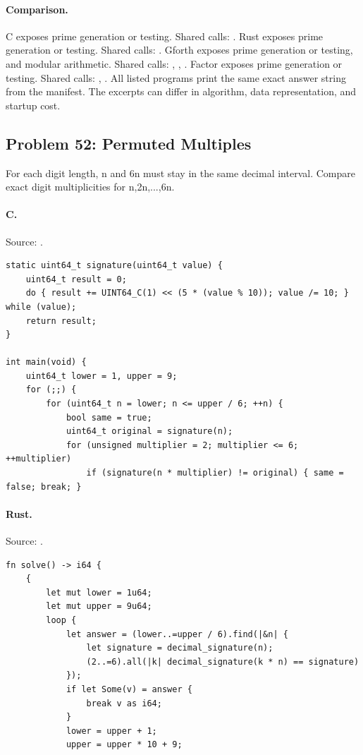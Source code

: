 \paragraph{Comparison.}
C exposes prime generation or testing. Shared calls: \texttt{}. Rust exposes prime generation or testing. Shared calls: \texttt{}. Gforth exposes prime generation or testing, and modular arithmetic. Shared calls: \texttt{}, \texttt{}, \texttt{}. Factor exposes prime generation or testing. Shared calls: \texttt{}, \texttt{}.
All listed programs print the same exact answer string from the manifest. The excerpts can differ in algorithm, data representation, and startup cost.

\subsection{Problem 52: Permuted Multiples}
\label{walkthrough:p52}
For each digit length, n and 6n must stay in the same decimal interval. Compare exact digit multiplicities for n,2n,...,6n.

\paragraph{C.} Source: .
\begin{lstlisting}
static uint64_t signature(uint64_t value) {
    uint64_t result = 0;
    do { result += UINT64_C(1) << (5 * (value % 10)); value /= 10; } while (value);
    return result;
}

int main(void) {
    uint64_t lower = 1, upper = 9;
    for (;;) {
        for (uint64_t n = lower; n <= upper / 6; ++n) {
            bool same = true;
            uint64_t original = signature(n);
            for (unsigned multiplier = 2; multiplier <= 6; ++multiplier)
                if (signature(n * multiplier) != original) { same = false; break; }
\end{lstlisting}

\paragraph{Rust.} Source: .
\begin{lstlisting}
fn solve() -> i64 {
    {
        let mut lower = 1u64;
        let mut upper = 9u64;
        loop {
            let answer = (lower..=upper / 6).find(|&n| {
                let signature = decimal_signature(n);
                (2..=6).all(|k| decimal_signature(k * n) == signature)
            });
            if let Some(v) = answer {
                break v as i64;
            }
            lower = upper + 1;
            upper = upper * 10 + 9;
\end{lstlisting}

